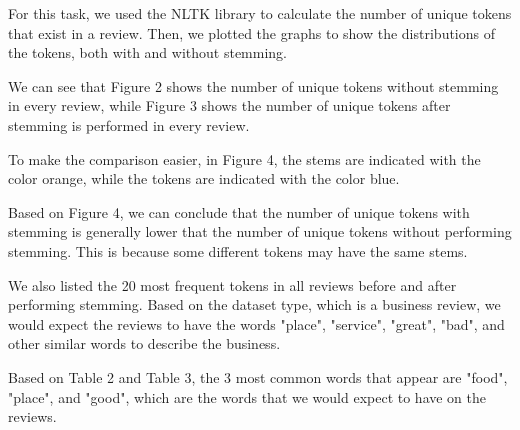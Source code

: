 For this task, we used the NLTK library to calculate the number of unique tokens that exist in a review. Then, we plotted the graphs to show the distributions of the tokens, both with and without stemming.

We can see that Figure 2 shows the number of unique tokens without stemming in every review, while Figure 3 shows the number of unique tokens after stemming is performed in every review.

To make the comparison easier, in Figure 4, the stems are indicated with the color orange, while the tokens are indicated with the color blue.

Based on Figure 4, we can conclude that the number of unique tokens with stemming is generally lower that the number of unique tokens without performing stemming. This is because some different tokens may have the same stems.

We also listed the 20 most frequent tokens in all reviews before and after performing stemming. Based on the dataset type, which is a business review, we would expect the reviews to have the words "place", "service", "great", "bad", and other similar words to describe the business.

Based on Table 2 and Table 3, the 3 most common words that appear are "food", "place", and "good", which are the words that we would expect to have on the reviews.